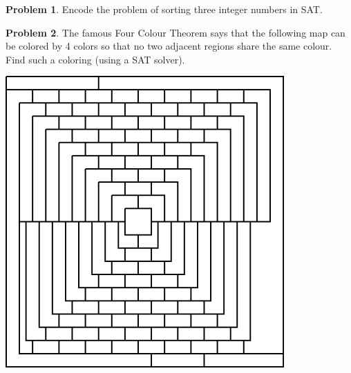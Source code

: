 \documentclass{amsart}
\theoremstyle{definition}
\newtheorem{problem}{Problem}
\begin{document}
\bigskip\begin{problem}
Encode the problem of sorting three integer numbers in SAT.
\end{problem}



\bigskip\begin{problem}
The famous Four Colour Theorem says that the following map can be colored by 4 colors so that no two adjacent regions share the same colour. Find such a coloring (using a SAT solver).
\begin{center}
\includegraphics[width=0.8\textwidth]{files/map.png}
\end{center}
\end{problem}
\end{document}
